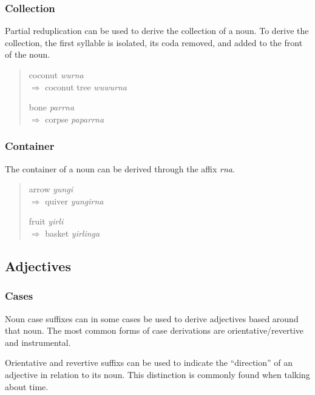 \subsubsection{Collection}

Partial reduplication can be used to derive the collection of a noun. To derive
the collection, the first syllable is isolated, its coda removed, and added to
the front of the noun.

\begin{quote}
\begin{multicols}{2}
coconut \textit{wurna}\\
$\Rightarrow$ coconut tree \textit{wuwurna}

bone \textit{parrna}\\
$\Rightarrow$ corpse \textit{paparrna}
\end{multicols}
\end{quote}

\subsubsection{Container}

The container of a noun can be derived through the affix \textit{rna}.

\begin{quote}
\begin{multicols}{2}
arrow \textit{yungi}\\
$\Rightarrow$ quiver \textit{yungirna}

fruit \textit{yirli}\\
$\Rightarrow$ basket \textit{yirlinga}
\end{multicols}
\end{quote}

\subsection{Adjectives}

\subsubsection{Cases}

Noun case suffixes can in some cases be used to derive adjectives based around
that noun. The most common forms of case derivations are orientative/revertive
and instrumental.

Orientative and revertive suffixs can be used to indicate the ``direction'' of
an adjective in relation to its noun. This distinction is commonly found when
talking about time.

